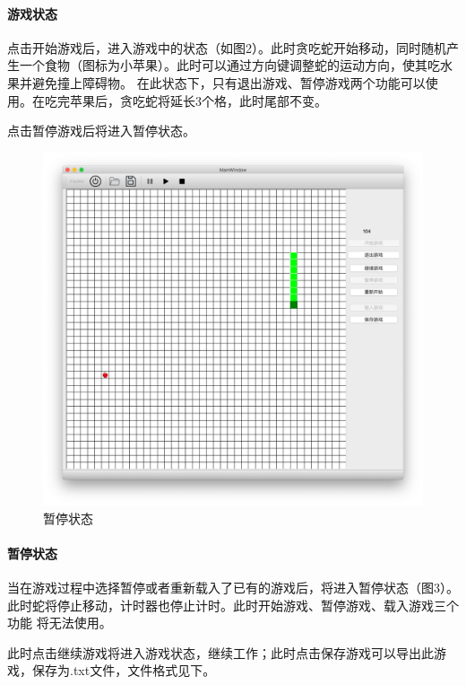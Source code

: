 \documentclass[utf-8]{ctexart}
\begin{document}
    \paragraph{游戏状态} 点击开始游戏后，进入游戏中的状态（如图2）。此时贪吃蛇开始移动，同时随机产生一个食物（图标为小苹果）。此时可以通过方向键调整蛇的运动方向，使其吃水果并避免撞上障碍物。
    在此状态下，只有退出游戏、暂停游戏两个功能可以使用。在吃完苹果后，贪吃蛇将延长3个格，此时尾部不变。
    \par 点击暂停游戏后将进入暂停状态。

    \begin{figure}[H]
        \centering
        \includegraphics[scale = 0.2]{texsrc/界面paused.png}
        \caption{暂停状态}
        \label{paused}
    \end{figure}
    \paragraph{暂停状态} 当在游戏过程中选择暂停或者重新载入了已有的游戏后，将进入暂停状态（图3）。此时蛇将停止移动，计时器也停止计时。此时开始游戏、暂停游戏、载入游戏三个功能
    将无法使用。
    \par 此时点击继续游戏将进入游戏状态，继续工作；此时点击保存游戏可以导出此游戏，保存为.txt文件，文件格式见下。
\end{document}
